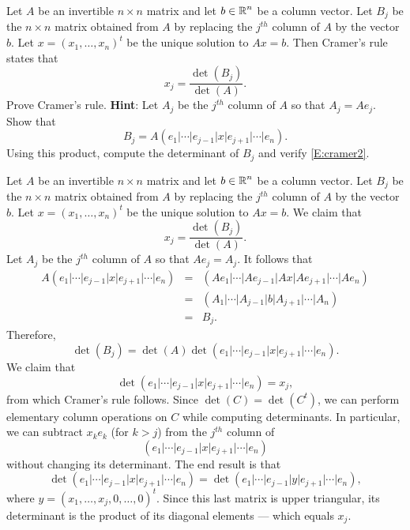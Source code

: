 \documentclass{ximera}
\begin{document}
\begin{exercise} \label{c10.1.c9}
Let $A$ be an invertible $n\times n$ matrix and let $b\in\mbox{$\Bbb{R}$}^n$ be a column 
vector. Let $B_j$ be the $n\times n$ matrix obtained from $A$ by replacing the 
$j^{th}$ column of $A$ by the vector $b$.  Let $x=(x_1,\ldots,x_n)^t$ be the 
unique solution to $Ax=b$. Then Cramer's rule  states that
\begin{equation}  \label{E:cramer2}
x_j = \frac{\det(B_j)}{\det(A)}.
\end{equation}
Prove Cramer's rule.  {\bf Hint}: Let $A_j$ be the $j^{th}$ column of $A$ so
that $A_j = Ae_j$.  Show that 
\[
B_j = A (e_1|\cdots|e_{j-1}|x|e_{j+1}|\cdots|e_n).
\]
Using this product, compute the determinant of $B_j$ and verify \eqref{E:cramer2}.

\begin{solution}

Let $A$ be an invertible $n\times n$ matrix and let $b\in\mbox{$\Bbb{R}$}^n$ be a column 
vector. Let $B_j$ be the $n\times n$ matrix obtained from $A$ by replacing 
the $j^{th}$ column of $A$ by the vector $b$.  Let $x=(x_1,\ldots,x_n)^t$ be 
the unique solution to $Ax=b$.  We claim that
\[
x_j = \frac{\det(B_j)}{\det(A)}.
\]
Let $A_j$ be the $j^{th}$ column of $A$ so that $Ae_j=A_j$.  It follows that 
\begin{eqnarray*}
A (e_1|\cdots|e_{j-1}|x|e_{j+1}|\cdots|e_n) & = & 
(A e_1|\cdots|A e_{j-1}|A x|A e_{j+1}|\cdots|A e_n)\\
& = & (A_1|\cdots|A_{j-1}|b|A_{j+1}|\cdots|A_n) \\
& = & B_j.
\end{eqnarray*}
Therefore,
\[
\det(B_j) = \det(A)\det(e_1|\cdots|e_{j-1}|x|e_{j+1}|\cdots|e_n).
\]
We claim that 
\[
\det(e_1|\cdots|e_{j-1}|x|e_{j+1}|\cdots|e_n)=x_j,
\]
from which Cramer's rule follows.  Since $\det(C)=\det(C^t)$, we can perform
elementary column operations on $C$ while computing determinants.  In
particular, we can subtract $x_ke_k$ (for $k>j$) from the $j^{th}$ column of
\[
(e_1|\cdots|e_{j-1}|x|e_{j+1}|\cdots|e_n)
\]
without changing its determinant.  The end result is that 
\[
\det(e_1|\cdots|e_{j-1}|x|e_{j+1}|\cdots|e_n)=
\det(e_1|\cdots|e_{j-1}|y|e_{j+1}|\cdots|e_n),
\]
where $y=(x_1,\ldots,x_j,0,\ldots,0)^t$.  Since this last matrix is upper
triangular, its determinant is the product of its diagonal elements ---
which equals $x_j$. 


\end{solution}
\end{exercise}
\end{document}
